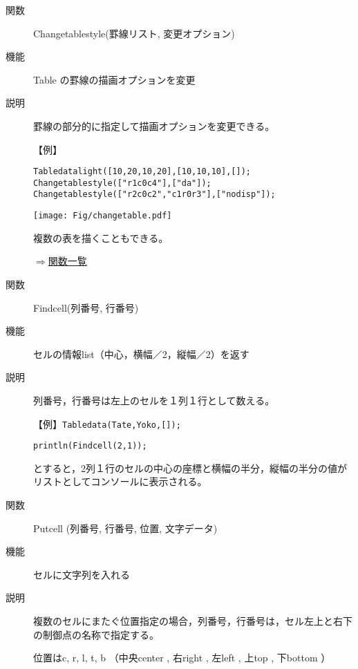\documentclass[papersize,a4paper,10pt,uplatex]{jsarticle}
\begin{document}
\begin{description}
\vspace{\baselineskip}
\hypertarget{changetablestyle}{}
\item[関数]Changetablestyle(罫線リスト, 変更オプション)
\item[機能]Table の罫線の描画オプションを変更
\item[説明]罫線の部分的に指定して描画オプションを変更できる。

\vspace{\baselineskip}
【例】

\verb|Tabledatalight([10,20,10,20],[10,10,10],[]);|\\
\verb|Changetablestyle(["r1c0c4"],["da"]);|\\
\verb|Changetablestyle(["r2c0c2","c1r0r3"],["nodisp"]);|

\vspace{\baselineskip}
\hspace{20mm}\texttt{[image: Fig/changetable.pdf]} 

\vspace{\baselineskip}
複数の表を描くこともできる。

\begin{flushright}\hyperlink{functionlist}{$\Rightarrow$関数一覧}\end{flushright}

\vspace{\baselineskip}
\hypertarget{findcell}{}
\item[関数]Findcell(列番号, 行番号)
\item[機能]セルの情報list（中心，横幅／2，縦幅／2）を返す
\item[説明]列番号，行番号は左上のセルを１列１行として数える。

\vspace{\baselineskip}
【例】\verb|Tabledata(Tate,Yoko,[]);|

\verb|println(Findcell(2,1));|

とすると，2列１行のセルの中心の座標と横幅の半分，縦幅の半分の値がリストとしてコンソールに表示される。

\vspace{\baselineskip}
\hypertarget{putcell}{}
\item[関数]Putcell (列番号, 行番号, 位置, 文字データ)
\item[機能]セルに文字列を入れる
\item[説明]複数のセルにまたぐ位置指定の場合，列番号，行番号は，セル左上と右下の制御点の名称で指定する。

位置はc, r, l, t, b （中央center , 右right , 左left , 上top , 下bottom ）


\end{description}
\end{document}
